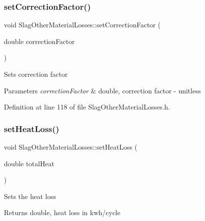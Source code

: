 \mbox{\label{class_slag_other_material_losses_a2aa985511888327bed6039da79c8958a}} 
\subsubsection{\texorpdfstring{set\+Correction\+Factor()}{setCorrectionFactor()}}
{\footnotesize\ttfamily void Slag\+Other\+Material\+Losses\+::set\+Correction\+Factor (\begin{DoxyParamCaption}\item[{double}]{correction\+Factor }\end{DoxyParamCaption})\hspace{0.3cm}{\ttfamily [inline]}}

Sets correction factor 
\begin{DoxyParams}{Parameters}
{\em correction\+Factor} & double, correction factor -\/ unitless \\
\hline
\end{DoxyParams}


Definition at line 118 of file Slag\+Other\+Material\+Losses.\+h.

\mbox{\label{class_slag_other_material_losses_a33d59aed5492ec2912615e93b6ff273e}} 
\subsubsection{\texorpdfstring{set\+Heat\+Loss()}{setHeatLoss()}}
{\footnotesize\ttfamily void Slag\+Other\+Material\+Losses\+::set\+Heat\+Loss (\begin{DoxyParamCaption}\item[{double}]{total\+Heat }\end{DoxyParamCaption})\hspace{0.3cm}{\ttfamily [inline]}}

Sets the heat loss \begin{DoxyReturn}{Returns}
double, heat loss in kwh/cycle 
\end{DoxyReturn}



